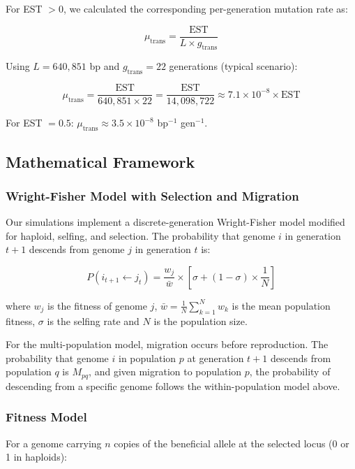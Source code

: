 \documentclass[
  11pt,
]{article}
\begin{document}
For EST \(> 0\), we calculated the corresponding per-generation mutation
rate as:

\[\mu_{\text{trans}} = \frac{\text{EST}}{L \times g_{\text{trans}}}\]

Using \(L = 640,851\) bp and \(g_{\text{trans}} = 22\) generations
(typical scenario):

\[\mu_{\text{trans}} = \frac{\text{EST}}{640,851 \times 22} = \frac{\text{EST}}{14,098,722} \approx 7.1 \times 10^{-8} \times \text{EST}\]

For EST \(= 0.5\): \(\mu_{\text{trans}} \approx 3.5 \times 10^{-8}\)
bp\(^{-1}\) gen\(^{-1}\).

\subsection{Mathematical Framework}\label{mathematical-framework}

\subsubsection{Wright-Fisher Model with Selection and
Migration}\label{wright-fisher-model-with-selection-and-migration}

Our simulations implement a discrete-generation Wright-Fisher model
modified for haploid, selfing, and selection. The probability that
genome \(i\) in generation \(t+1\) descends from genome \(j\) in
generation \(t\) is:

\[P(i_{t+1} \leftarrow j_t) = \frac{w_j}{\bar{w}} \times \left[\sigma + (1-\sigma) \times \frac{1}{N}\right]\]

where \(w_j\) is the fitness of genome \(j\),
\(\bar{w} = \frac{1}{N}\sum_{k=1}^N w_k\) is the mean population
fitness, \(\sigma\) is the selfing rate and \(N\) is the population
size.

For the multi-population model, migration occurs before reproduction.
The probability that genome \(i\) in population \(p\) at generation
\(t+1\) descends from population \(q\) is \(M_{pq}\), and given
migration to population \(p\), the probability of descending from a
specific genome follows the within-population model above.

\subsubsection{Fitness Model}\label{fitness-model}

For a genome carrying \(n\) copies of the beneficial allele at the
selected locus (0 or 1 in haploids):
\end{document}

